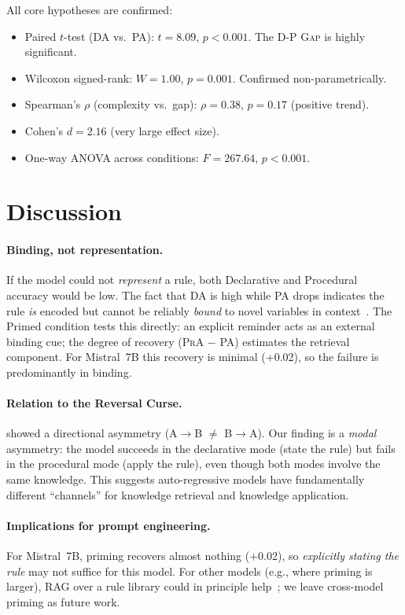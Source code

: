 \documentclass[11pt]{article}
\newcommand{\dpgap}{\textsc{D-P Gap}}
\newcommand{\da}{\textsc{DA}}
\newcommand{\pa}{\textsc{PA}}
\newcommand{\pra}{\textsc{PrA}}
\begin{document}
All core hypotheses are confirmed:
\begin{itemize}
    \item Paired $t$-test (\da{} vs.\ \pa{}): $t = 8.09$, $p < 0.001$. The \dpgap{} is highly significant.
    \item Wilcoxon signed-rank: $W = 1.00$, $p = 0.001$. Confirmed non-parametrically.
    \item Spearman's $\rho$ (complexity vs.\ gap): $\rho = 0.38$, $p = 0.17$ (positive trend).
    \item Cohen's $d = 2.16$ (very large effect size).
    \item One-way ANOVA across conditions: $F = 267.64$, $p < 0.001$.
\end{itemize}

\section{Discussion}
\label{sec:discussion}

\paragraph{Binding, not representation.}
If the model could not \emph{represent} a rule, both Declarative and
Procedural accuracy would be low.
The fact that \da{} is high while \pa{} drops indicates the rule
\emph{is} encoded but cannot be reliably \emph{bound} to novel
variables in context~\cite{greff2020binding}.
The Primed condition tests this directly: an explicit reminder acts
as an external binding cue; the degree of recovery (\pra{} $-$ \pa{})
estimates the retrieval component. For Mistral~7B this recovery is
minimal (+0.02), so the failure is predominantly in binding.

\paragraph{Relation to the Reversal Curse.}
\citet{berglund2024reversal} showed a directional asymmetry
(A$\to$B $\neq$ B$\to$A).
Our finding is a \emph{modal} asymmetry: the model succeeds in the
declarative mode (state the rule) but fails in the procedural mode
(apply the rule), even though both modes involve the same knowledge.
This suggests auto-regressive models have fundamentally different
``channels'' for knowledge retrieval and knowledge application.

\paragraph{Implications for prompt engineering.}
For Mistral~7B, priming recovers almost nothing (+0.02), so
\emph{explicitly stating the rule} may not suffice for this model.
For other models (e.g., where priming is larger), RAG over a rule
library could in principle help~\cite{garcez2023neurosymbolic}; we
leave cross-model priming as future work.
\end{document}
